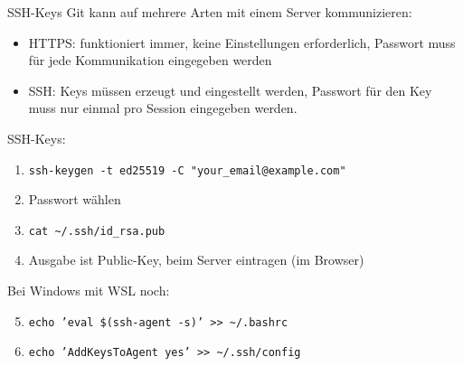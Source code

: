 \begin{frame}{SSH-Keys}
  Git kann auf mehrere Arten mit einem Server kommunizieren:
  \begin{itemize}
    \item HTTPS: funktioniert immer, keine Einstellungen erforderlich, Passwort muss für jede Kommunikation eingegeben werden
    \item SSH: Keys müssen erzeugt und eingestellt werden, Passwort für den Key muss nur einmal pro Session eingegeben werden.
  \end{itemize}

  SSH-Keys:
  \begin{enumerate}
    \item \texttt{ssh-keygen -t ed25519 -C "your\_email@example.com"}
    \item Passwort wählen
    \item \texttt{cat \textasciitilde/.ssh/id\_rsa.pub}
    \item Ausgabe ist Public-Key, beim Server eintragen (im Browser)
  \end{enumerate}
  Bei Windows mit WSL noch:
  \begin{enumerate}
    \setcounter{enumi}{4}
    \item \texttt{echo 'eval \$(ssh-agent -s)' >> \textasciitilde/.bashrc}
    \item \texttt{echo 'AddKeysToAgent yes' >> \textasciitilde/.ssh/config}
  \end{enumerate}
\end{frame}
